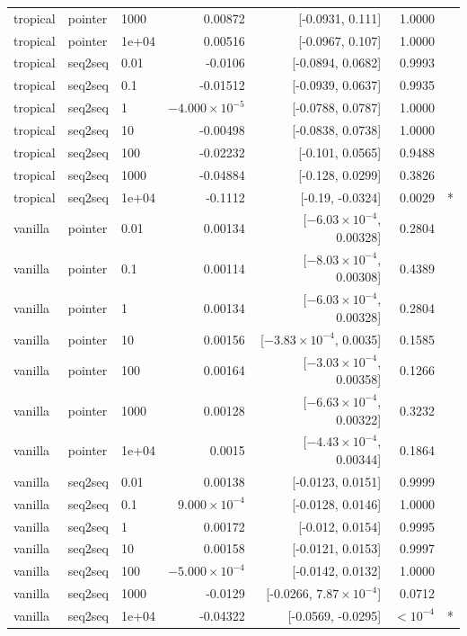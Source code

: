 \documentclass[10pt]{article}
\begin{document}
{\begin{longtable}{lllrrrl}
tropical & pointer & 1000 & 0.00872 & [-0.0931, 0.111] & 1.0000 & \\
tropical & pointer & 1e+04 & 0.00516 & [-0.0967, 0.107] & 1.0000 & \\
tropical & seq2seq & 0.01 & -0.0106 & [-0.0894, 0.0682] & 0.9993 & \\
tropical & seq2seq & 0.1 & -0.01512 & [-0.0939, 0.0637] & 0.9935 & \\
tropical & seq2seq & 1 & $-4.000\times10^{-5}$ & [-0.0788, 0.0787] & 1.0000 & \\
tropical & seq2seq & 10 & -0.00498 & [-0.0838, 0.0738] & 1.0000 & \\
tropical & seq2seq & 100 & -0.02232 & [-0.101, 0.0565] & 0.9488 & \\
tropical & seq2seq & 1000 & -0.04884 & [-0.128, 0.0299] & 0.3826 & \\
tropical & seq2seq & 1e+04 & -0.1112 & [-0.19, -0.0324] & 0.0029 & *\\
vanilla & pointer & 0.01 & 0.00134 & [$-6.03\times10^{-4}$, 0.00328] & 0.2804 & \\
vanilla & pointer & 0.1 & 0.00114 & [$-8.03\times10^{-4}$, 0.00308] & 0.4389 & \\
vanilla & pointer & 1 & 0.00134 & [$-6.03\times10^{-4}$, 0.00328] & 0.2804 & \\
vanilla & pointer & 10 & 0.00156 & [$-3.83\times10^{-4}$, 0.0035] & 0.1585 & \\
vanilla & pointer & 100 & 0.00164 & [$-3.03\times10^{-4}$, 0.00358] & 0.1266 & \\
vanilla & pointer & 1000 & 0.00128 & [$-6.63\times10^{-4}$, 0.00322] & 0.3232 & \\
vanilla & pointer & 1e+04 & 0.0015 & [$-4.43\times10^{-4}$, 0.00344] & 0.1864 & \\
vanilla & seq2seq & 0.01 & 0.00138 & [-0.0123, 0.0151] & 0.9999 & \\
vanilla & seq2seq & 0.1 & $9.000\times10^{-4}$ & [-0.0128, 0.0146] & 1.0000 & \\
vanilla & seq2seq & 1 & 0.00172 & [-0.012, 0.0154] & 0.9995 & \\
vanilla & seq2seq & 10 & 0.00158 & [-0.0121, 0.0153] & 0.9997 & \\
vanilla & seq2seq & 100 & $-5.000\times10^{-4}$ & [-0.0142, 0.0132] & 1.0000 & \\
vanilla & seq2seq & 1000 & -0.0129 & [-0.0266, $7.87\times10^{-4}$] & 0.0712 & \\
vanilla & seq2seq & 1e+04 & -0.04322 & [-0.0569, -0.0295] & $<10^{-4}$ & *\\
\bottomrule
\end{longtable}
}
\end{document}
